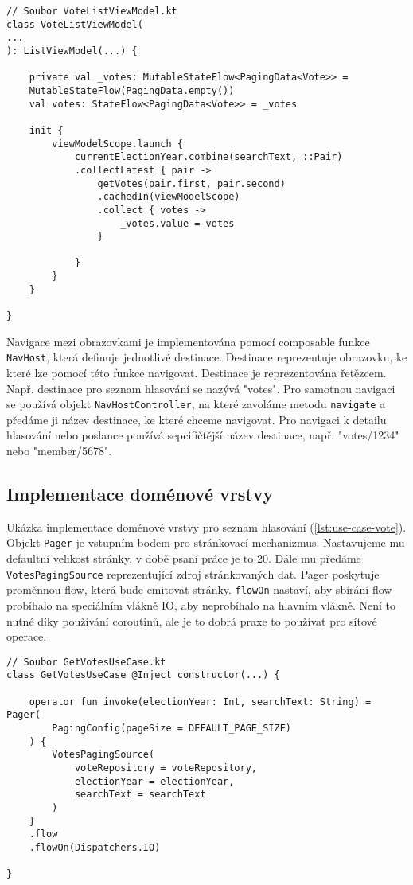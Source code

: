 \begin{lstlisting}[caption={Ukázka využití view modelu}, label={lst:view-model}, tabsize=2]
// Soubor VoteListViewModel.kt
class VoteListViewModel(
...
): ListViewModel(...) {
	
	private val _votes: MutableStateFlow<PagingData<Vote>> =
	MutableStateFlow(PagingData.empty())
	val votes: StateFlow<PagingData<Vote>> = _votes
	
	init {
		viewModelScope.launch {
			currentElectionYear.combine(searchText, ::Pair)
			.collectLatest { pair ->
				getVotes(pair.first, pair.second)
				.cachedIn(viewModelScope)
				.collect { votes ->
					_votes.value = votes
				}
				
			}
		}
	}
	
}
\end{lstlisting}

\vspace{10px}

\noindent Navigace mezi obrazovkami je implementována pomocí composable funkce \lstinline|NavHost|, která definuje jednotlivé destinace. Destinace reprezentuje obrazovku, ke které lze pomocí této funkce navigovat. Destinace je reprezentována řetězcem. Např. destinace pro seznam hlasování se nazývá "votes". Pro samotnou navigaci se používá objekt \lstinline|NavHostController|, na které zavoláme metodu \lstinline|navigate| a předáme ji název destinace, ke které chceme navigovat. Pro navigaci k detailu hlasování nebo poslance používá sepcifičtější název destinace, např. "votes/1234" nebo "member/5678".

\subsection {Implementace doménové vrstvy}
Ukázka implementace doménové vrstvy pro seznam hlasování (\ref{lst:use-case-vote}). Objekt \lstinline|Pager| je vstupním bodem pro stránkovací mechanizmus. Nastavujeme mu defaultní velikost stránky, v době psaní práce je to 20. Dále mu předáme \lstinline|VotesPagingSource| reprezentující zdroj stránkovaných dat. Pager poskytuje proměnnou flow, která bude emitovat stránky. \lstinline|flowOn| nastaví, aby sbírání flow probíhalo na speciálním vlákně IO, aby neprobíhalo na hlavním vlákně. Není to nutné díky používání coroutinů, ale je to dobrá praxe to používat pro síťové operace.

\begin{lstlisting}[caption={Ukázka využití use caseu pro získání seznamu hlasování}, label={lst:use-case-vote}, tabsize=2]
// Soubor GetVotesUseCase.kt
class GetVotesUseCase @Inject constructor(...) {
	
	operator fun invoke(electionYear: Int, searchText: String) = Pager(
		PagingConfig(pageSize = DEFAULT_PAGE_SIZE)
	) {
		VotesPagingSource(
			voteRepository = voteRepository,
			electionYear = electionYear,
			searchText = searchText
		)
	}
	.flow
	.flowOn(Dispatchers.IO)
	
}
\end{lstlisting}

